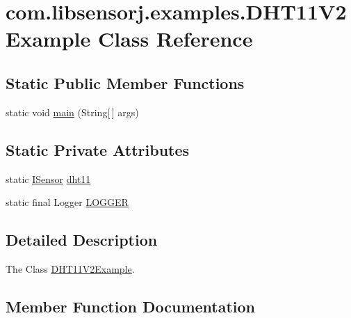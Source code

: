 \hypertarget{classcom_1_1libsensorj_1_1examples_1_1DHT11V2Example}{}\section{com.\+libsensorj.\+examples.\+D\+H\+T11\+V2\+Example Class Reference}
\label{classcom_1_1libsensorj_1_1examples_1_1DHT11V2Example}
\subsection*{Static Public Member Functions}
\begin{DoxyCompactItemize}
\item 
static void \hyperlink{classcom_1_1libsensorj_1_1examples_1_1DHT11V2Example_a423db1184c15475e4b120b7f2783545b}{main} (String\mbox{[}$\,$\mbox{]} args)
\end{DoxyCompactItemize}
\subsection*{Static Private Attributes}
\begin{DoxyCompactItemize}
\item 
static \hyperlink{interfacecom_1_1libsensorj_1_1interfaces_1_1ISensor}{I\+Sensor} \hyperlink{classcom_1_1libsensorj_1_1examples_1_1DHT11V2Example_a5bc507916742167876ff258c298163ed}{dht11}
\item 
static final Logger \hyperlink{classcom_1_1libsensorj_1_1examples_1_1DHT11V2Example_a962cfebacb8855647655c3b6c0f6f698}{L\+O\+G\+G\+E\+R}
\end{DoxyCompactItemize}


\subsection{Detailed Description}
The Class \hyperlink{classcom_1_1libsensorj_1_1examples_1_1DHT11V2Example}{D\+H\+T11\+V2\+Example}. 

\subsection{Member Function Documentation}
\hypertarget{classcom_1_1libsensorj_1_1examples_1_1DHT11V2Example_a423db1184c15475e4b120b7f2783545b}{}
